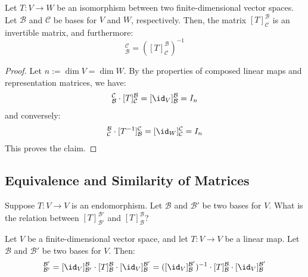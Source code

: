 \begin{proposition}
\label{prop:representation_of_isomorphisms}
Let $T: V \to W$ be an isomorphism between two finite-dimensional vector spaces. Let $\mathcal{B}$ and $\mathcal{C}$ be bases for $V$ and $W$, respectively. Then, the matrix $[T]_{\mathcal{C}}^{\mathcal{B}}$ is an invertible matrix, and furthermore:
\begin{equation*}
    [T^{-1}]_{\mathcal{B}}^{\mathcal{C}} = ([T]_{\mathcal{C}}^{\mathcal{B}})^{-1}
\end{equation*}
\end{proposition}

\begin{proof}
Let $n := \dim V = \dim W$. By the properties of composed linear maps and representation matrices, we have:
\begin{equation*}
    [T^{-1}]_{\mathcal{B}}^{\mathcal{C}} \cdot [T]_{\mathcal{C}}^{\mathcal{B}} = [\id_V]_{\mathcal{B}}^{\mathcal{B}} = I_n
\end{equation*}
and conversely:
\begin{equation*}
    [T]_{\mathcal{C}}^{\mathcal{B}} \cdot [T^{-1}]_{\mathcal{B}}^{\mathcal{C}} = [\id_W]_{\mathcal{C}}^{\mathcal{C}} = I_n
\end{equation*}
This proves the claim.
\end{proof}

\subsection{Equivalence and Similarity of Matrices}

\begin{question}
Suppose $T: V \to V$ is an endomorphism. Let $\mathcal{B}$ and $\mathcal{B}'$ be two bases for $V$. What is the relation between $[T]_{\mathcal{B}'}^{\mathcal{B}'}$ and $[T]_{\mathcal{B}}^{\mathcal{B}}$?
\end{question}

\begin{corollary}
\label{cor:similarity_of_representation_matrices}
Let $V$ be a finite-dimensional vector space, and let $T: V \to V$ be a linear map. Let $\mathcal{B}$ and $\mathcal{B}'$ be two bases for $V$. Then:
\begin{equation*}
    [T]_{\mathcal{B}'}^{\mathcal{B}'} = [\id_V]_{\mathcal{B}'}^{\mathcal{B}} \cdot [T]_{\mathcal{B}}^{\mathcal{B}} \cdot [\id_V]_{\mathcal{B}}^{\mathcal{B}'} = ([\id_V]_{\mathcal{B}}^{\mathcal{B}'})^{-1} \cdot [T]_{\mathcal{B}}^{\mathcal{B}} \cdot [\id_V]_{\mathcal{B}}^{\mathcal{B}'}
\end{equation*}
\end{corollary}

